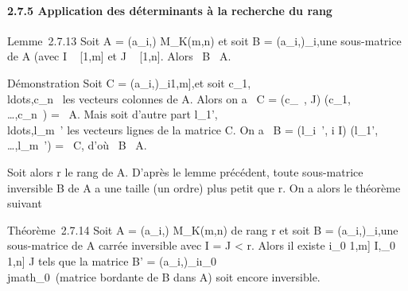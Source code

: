 \documentclass[]{article}
\begin{document}
\paragraph{2.7.5 Application des déterminants à la recherche du rang}

Lemme~2.7.13 Soit A = (a\_i,\jmath) \in M\_K(m,n) et soit B =
(a\_i,\jmath)\_i\inI,\jmath\inJ une sous-matrice de A (avec I \subset~
{[}1,m{]} et J \subset~ {[}1,n{]}. Alors
\mathrmrg~B
\leq\mathrmrg~A.

Démonstration Soit C = (a\_i,\jmath)\_i\in{[}1,m{]},\jmath\inJ et soit
c\_1,\\ldots,c\_n~
les vecteurs colonnes de A. Alors on a
\mathrmrg~C
= \mathrmrg(c\_\jmath~, \jmath
\in J)
\leq\mathrmrg(c\_1,\\\ldots,c\_n~)
= \mathrmrg~A. Mais soit
d'autre part
l\_1',\\ldots,l\_m~'
les vecteurs lignes de la matrice C. On a
\mathrmrg~B
= \mathrmrg(l\_i~',
i \in I)
\leq\mathrmrg(l\_1',\\\ldots,l\_m~')
= \mathrmrg~C, d'où
\mathrmrg~B
\leq\mathrmrg~A.

Soit alors r le rang de A. D'après le lemme précédent, toute
sous-matrice inversible B de A a une taille (un ordre) plus petit que r.
On a alors le théorème suivant

Théorème~2.7.14 Soit A = (a\_i,\jmath) \in M\_K(m,n) de rang r
et soit B = (a\_i,\jmath)\_i\inI,\jmath\inJ une sous-matrice de A
carrée inversible avec \textbar{}I\textbar{} = \textbar{}J\textbar{}
\textless{} r. Alors il existe i\_0 \in {[}1,m{]} \diagdown I,\jmath\_0
\in {[}1,n{]} \diagdown J tels que la matrice B' =
(a\_i,\jmath)\_i\inI\cup\i\_0\,\jmath\inJ\cup\\jmath\_0\
(matrice bordante de B dans A) soit encore inversible.
\end{document}
